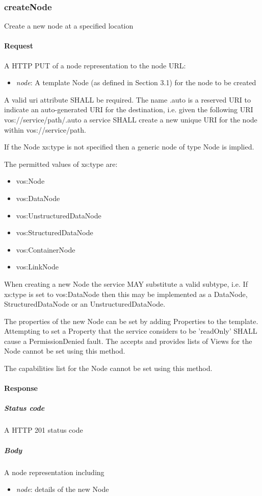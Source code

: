 \documentclass[11pt,a4paper]{ivoa}
\begin{document}
\subsubsection{createNode}
\label{subsubsec:createnode}
Create a new node at a specified location

\paragraph{Request}
A HTTP PUT of a node representation to the node URL:
\begin{itemize}
    \item \emph{node}: A template Node (as defined in Section 3.1) for the node to be created
\end{itemize}

A valid uri attribute SHALL be required. The name .auto is a reserved URI to indicate an auto-generated URI for the destination, i.e. given the following URI vos://service/path/.auto a service SHALL create a new unique URI for the node within vos://service/path.

If the Node xs:type is not specified then a generic node of type Node is implied.

The permitted values of xs:type are:

\begin{itemize}
    \item vos:Node
    \item vos:DataNode
    \item vos:UnstructuredDataNode
    \item vos:StructuredDataNode
    \item vos:ContainerNode
    \item vos:LinkNode
\end{itemize}

When creating a new Node the service MAY substitute a valid subtype, i.e. If xs:type is set to vos:DataNode then this may be implemented as a DataNode, StructuredDataNode or an UnstructuredDataNode.

The properties of the new Node can be set by adding Properties to the template. Attempting to set a Property that the service considers to be 'readOnly' SHALL cause a PermissionDenied fault. The accepts and provides lists of Views for the Node cannot be set using this method.

The capabilities list for the Node cannot be set using this method.

\paragraph{Response}
\subparagraph{Status code} A HTTP 201 status code
\subparagraph{Body}
A node representation including
\begin{itemize}
    \item \emph{node}: details of the new Node
\end{itemize}
\end{document}
